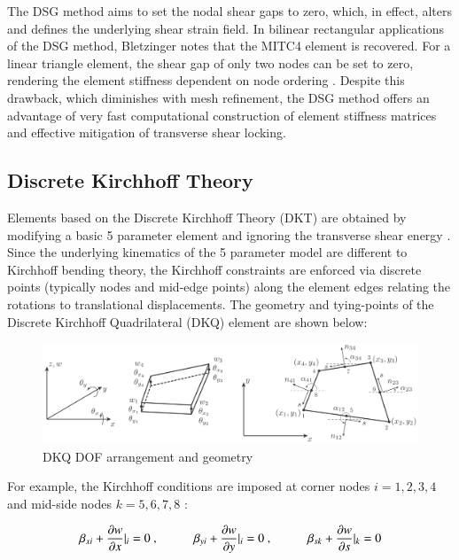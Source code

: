 The DSG method aims to set the nodal shear gaps to zero, which, in effect, alters and defines the underlying shear strain field. In bilinear rectangular applications of the DSG method, Bletzinger \cite{Ble00} notes that the MITC4 element is recovered. For a linear triangle element, the shear gap of only two nodes can be set to zero, rendering the element stiffness dependent on node ordering \cite{Ble00}. Despite this drawback, which diminishes with mesh refinement, the DSG method offers an advantage of very fast computational construction of element stiffness matrices and effective mitigation of transverse shear locking.

\subsection{Discrete Kirchhoff Theory}
\label{dkqtheory}

Elements based on the Discrete Kirchhoff Theory (DKT) are obtained by modifying a basic 5 parameter element and ignoring the transverse shear energy \cite{Batoz1980}. Since the underlying kinematics of the 5 parameter model are different to Kirchhoff bending theory, the Kirchhoff constraints are enforced via discrete points (typically nodes and mid-edge points) along the element edges relating the rotations to translational displacements. The geometry and tying-points of the Discrete Kirchhoff Quadrilateral (DKQ) element are shown below:

\begin{figure}[H]
	\centering
	\def\svgwidth{\columnwidth}
	\includegraphics[width=15cm]{images/8nodeseren.png}
	\caption{DKQ DOF arrangement and geometry \cite{Bar12}}
	\label{DKQlayout}
\end{figure}

For example, the Kirchhoff conditions are imposed at corner nodes $i = 1, 2, 3, 4$ and mid-side nodes $k = 5, 6, 7, 8$ \cite{Bar12}:

\begin{equation} 
\beta_{xi} + \frac{\partial w}{\partial x} \rvert_i = 0\ ,
\hspace{10mm}
\beta_{yi} + \frac{\partial w}{\partial y} \rvert_i = 0\ ,
\hspace{10mm}
\beta_{sk} + \frac{\partial w}{\partial s} \rvert_k = 0
\label{eqsdkt}
\end{equation}

